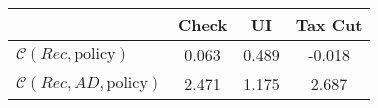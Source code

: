 \begin{tabular}{@{}lccc@{}} 
\toprule 
                          & Check      & UI    & Tax Cut    \\  \midrule 
$\mathcal{C}(Rec,\text{policy})$ & 0.063  & 0.489  & -0.018     \\ 
$\mathcal{C}(Rec, AD,\text{policy})$ & 2.471  & 1.175  & 2.687     \\ 
\end{tabular}  
